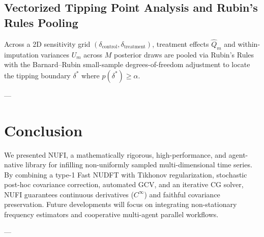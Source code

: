 \documentclass[11pt,a4paper]{article}
\begin{document}
\subsection{Vectorized Tipping Point Analysis and Rubin's Rules Pooling}
Across a 2D sensitivity grid $(\delta_{\text{control}}, \delta_{\text{treatment}})$, treatment effects $\hat{Q}_m$ and within-imputation variances $U_m$ across $M$ posterior draws are pooled via Rubin's Rules \cite{Rubin1987} with the Barnard--Rubin small-sample degrees-of-freedom adjustment \cite{Barnard1999, vanBuuren2011} to locate the tipping boundary $\delta^*$ where $p(\delta^*) \ge \alpha$.

---

\section{Conclusion}
We presented NUFI, a mathematically rigorous, high-performance, and agent-native library for infilling non-uniformly sampled multi-dimensional time series. By combining a type-1 Fast NUDFT with Tikhonov regularization, stochastic post-hoc covariance correction, automated GCV, and an iterative CG solver, NUFI guarantees continuous derivatives ($C^\infty$) and faithful covariance preservation. Future developments will focus on integrating non-stationary frequency estimators and cooperative multi-agent parallel workflows.

---
\end{document}
